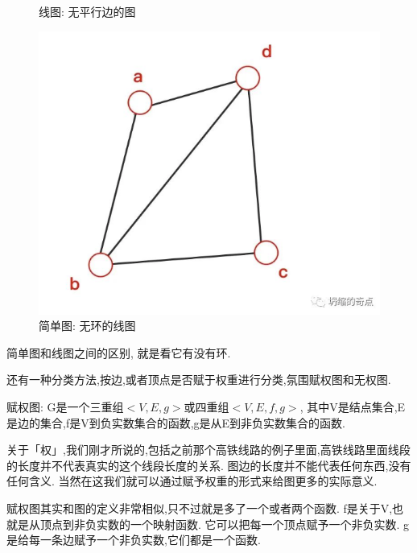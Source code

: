 \begin{figure}[ht]
\begin{minipage}[t]{0.3\textwidth}
    \caption{线图: 无平行边的图}
    \label{fig:img25_10}
  \end{minipage}%
  \hspace{0.5em}
  \begin{minipage}[t]{0.3\textwidth}
    \includegraphics[width=\textwidth]{asset/20231227145259.png}
    \caption{简单图: 无环的线图}
    \label{fig:img25_11}
  \end{minipage}
\end{figure}

简单图和线图之间的区别, 就是看它有没有环. 

还有一种分类方法,按边,或者顶点是否赋于权重进行分类,氛围赋权图和无权图. 

赋权图: G是一个三重组$<V,E,g>$或四重组$<V,E,f,g>$, 其中V是结点集合,E是边的集合,f是V到负实数集合的函数,g是从E到非负实数集合的函数. 

关于「权」,我们刚才所说的,包括之前那个高铁线路的例子里面,高铁线路里面线段的长度并不代表真实的这个线段长度的关系. 图边的长度并不能代表任何东西,没有任何含义. 当然在这我们就可以通过赋予权重的形式来给图更多的实际意义. 

赋权图其实和图的定义非常相似,只不过就是多了一个或者两个函数. f是关于V,也就是从顶点到非负实数的一个映射函数. 它可以把每一个顶点赋予一个非负实数. g是给每一条边赋予一个非负实数,它们都是一个函数. 

